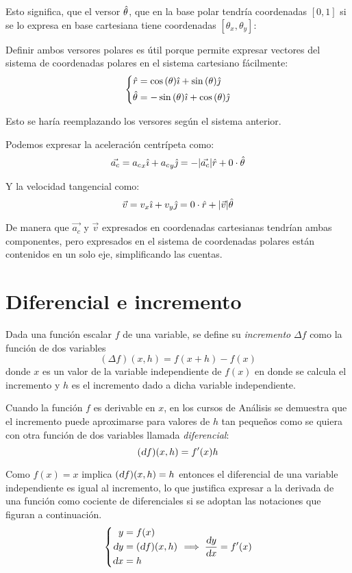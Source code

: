 Esto significa, que el versor $\hat{\theta}$, que en la base polar tendría coordenadas $[0,1]$ si se lo expresa en base cartesiana tiene coordenadas $[\theta_x,\theta_y]$:

Definir ambos versores polares es útil porque permite expresar vectores del sistema de coordenadas polares en el sistema cartesiano fácilmente:
\[
  \left\{
    \begin{aligned}
      \hat{r} &= \cos{(\theta)} \hat{\imath} + \sin{(\theta)} \hat{\jmath}
      \\
      \hat{\theta} &= -\sin{(\theta)} \hat{\imath} + \cos{(\theta)} \hat{\jmath}
    \end{aligned}
  \right.
\]

Esto se haría reemplazando los versores según el sistema anterior.

Podemos expresar la aceleración centrípeta como:
\[ \Vec{a_c} = {a_c}_x \hat{\imath} + {a_c}_y \hat{\jmath} = -{\left| {\Vec{a_c}} \right|} \hat{r} + 0 \cdot \hat{\theta} \]

Y la velocidad tangencial como:
\[ \Vec{v} = v_x \hat{\imath} + v_y \hat{\jmath} = 0 \cdot \hat{r} + {\left| {\Vec{v}} \right|} \hat{\theta}\]

De manera que $\Vec{a_c}$ y $\Vec{v}$ expresados en coordenadas cartesianas tendrían ambas componentes, pero expresados en el sistema de coordenadas polares están contenidos en un solo eje, simplificando las cuentas.


\section{Diferencial e incremento}

Dada una función escalar $f$ de una variable, se define su \emph{incremento} $\Delta f$ como la función de dos variables
\[ \left( \Delta f \right)\!(x, h) = f(x+h) - f(x) \]
donde $x$ es un valor de la variable independiente de $f(x)$ en donde se calcula el incremento y $h$ es el incremento dado a dicha variable independiente.

Cuando la función $f$ es derivable en $x$, en los cursos de Análisis se demuestra que el incremento puede aproximarse para valores de $h$ tan pequeños como se quiera con otra función de dos variables llamada \emph{diferencial}:
\[ \left( \textsl{d} f \right)\!(x, h) = f'(x) h \]

Como $f(x) = x$ implica $\left( \textsl{d} f \right)\!(x, h) = h$ entonces el diferencial de una variable independiente es igual al incremento, lo que justifica expresar a la derivada de una función como cociente de diferenciales si se adoptan las notaciones que figuran a continuación.
\[
  \left\{ \begin{aligned}
    y &= f(x)
    \\
    \textsl{d} y &= \left( \textsl{d} f \right)\!(x, h)
    \\
    \textsl{d} x &= h
  \end{aligned} \right.
  \implies \frac{\textsl{d} y}{\textsl{d} x} = f'(x)
\]


